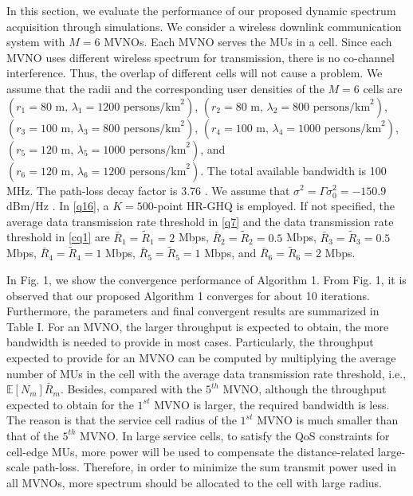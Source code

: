 \documentclass[journal]{IEEEtran}
\begin{document}
In this section, we evaluate the performance of our proposed dynamic spectrum acquisition through simulations. We consider a wireless downlink communication system with $M=6$ MVNOs. Each MVNO serves the MUs in a cell. Since each MVNO uses different wireless spectrum for transmission, there is no co-channel interference. Thus, the overlap of different cells will not cause a problem. We assume that the radii and the corresponding user densities of the $M=6$ cells are $(r_1 = 80\mbox{ m, }\lambda_1 = 1200\mbox{ persons/km}^2)$, $(r_2 = 80\mbox{ m, }\lambda_2 = 800\mbox{ persons/km}^2)$, $(r_3 = 100\mbox{ m, }\lambda_3 = 800\mbox{ persons/km}^2)$, $(r_4 = 100\mbox{ m, }\lambda_4 = 1000\mbox{ persons/km}^2)$, $(r_5 = 120\mbox{ m, }\lambda_5 = 1000\mbox{ persons/km}^2)$, and $(r_6 = 120\mbox{ m, }\lambda_6 = 1200\mbox{ persons/km}^2)$. The total available bandwidth is 100 MHz. The path-loss decay factor is 3.76 \cite{3GPP2}. We assume that $\sigma^2=\Gamma\sigma_0^2=-150.9$ dBm/Hz \cite{3GPP2}. In \eqref{q16}, a $K=500$-point HR-GHQ is employed. If not specified, the average data transmission rate threshold in \eqref{q7} and the data transmission rate threshold in \eqref{cq1} are $\bar{R}_1 =\tilde{R}_1=2$ Mbps, $\bar{R}_2 =\tilde{R}_2=0.5$ Mbps, $\bar{R}_3=\tilde{R}_3=0.5$ Mbps, $\bar{R}_4 =\tilde{R}_4=1$ Mbps, $\bar{R}_5=\tilde{R}_5=1$ Mbps, and $\bar{R}_6 =\tilde{R}_6=2$ Mbps.

In Fig. 1, we show the convergence performance of Algorithm 1. From Fig. 1, it is observed that our proposed Algorithm 1 converges for about 10 iterations. {\color{red}Furthermore,  the parameters and final convergent results are summarized in Table I. For an MVNO, the larger throughput is expected to obtain, the more bandwidth is needed to provide in most cases. Particularly, the throughput expected to provide for an MVNO can be computed by multiplying the average number of MUs in the cell with the average data transmission rate threshold, i.e., $\mathbb{E}[N_m]\bar{R}_m$. Besides, compared with the $5^{th}$ MVNO, although the throughput expected to obtain for the $1^{st}$ MVNO is larger, the required bandwidth is less. The reason is that the service cell radius of the $1^{st}$ MVNO is much smaller than that of the $5^{th}$ MVNO. In large service cells, to satisfy the QoS constraints for cell-edge MUs, more power will be used to compensate the distance-related large-scale path-loss. Therefore, in order to minimize the sum transmit power used in all MVNOs, more spectrum should be allocated to the cell with large radius.}
\end{document}
